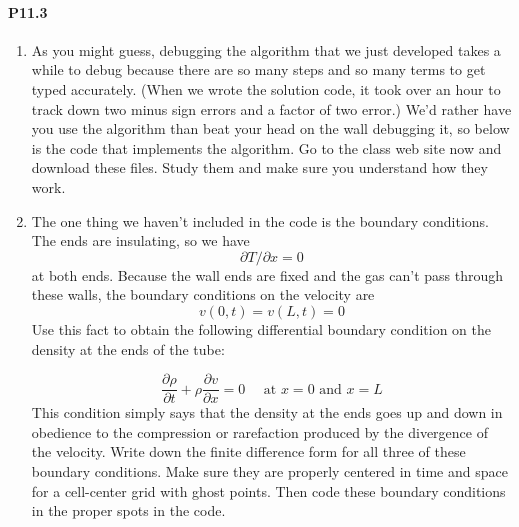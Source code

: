 \documentclass{book}
\theoremstyle{plain}
\theoremstyle{definition}
\numberwithin{exm}{chapter}
\theoremstyle{remark}
\theoremstyle{summary}
\theoremstyle{overview}
\begin{document}
\paragraph*{P11.3}
\begin{enumerate}[label=(\alph*)]
	\item As you might guess, debugging the algorithm that we just developed takes a while to debug because there are so many steps and so many terms to get typed accurately. (When we wrote the solution code, it took over an hour to track down two minus sign errors and a factor of two error.) We\rq d rather have you use the algorithm than beat your head on the wall debugging it, so below is the code that implements the algorithm. Go to the class web site now and download these files. Study them and make sure you understand how they work.
	\item The one thing we haven\rq t included in the code is the boundary conditions. The ends are insulating, so we have
	\begin{equation}\label{eq:1128}
\partial T / \partial x=0
\end{equation}
at both ends. Because the wall ends are fixed and the gas can\rq t pass through these walls, the boundary conditions on the velocity are
\begin{equation}\label{eq:1129}
v(0, t)=v(L, t)=0
\end{equation}
Use this fact to obtain the following differential boundary condition
on the density at the ends of the tube:

\begin{equation}\label{eq:1130}
\frac{\partial \rho}{\partial t}+\rho \frac{\partial v}{\partial x}=0 \quad \text { at } x=0 \text { and } x=L
\end{equation}
This condition simply says that the density at the ends goes up and
down in obedience to the compression or rarefaction produced by the
divergence of the velocity.
Write down the finite difference form for all three of these boundary
conditions. Make sure they are properly centered in time and space
for a cell-center grid with ghost points. Then code these boundary
conditions in the proper spots in the code.

\end{enumerate}
\end{document}
